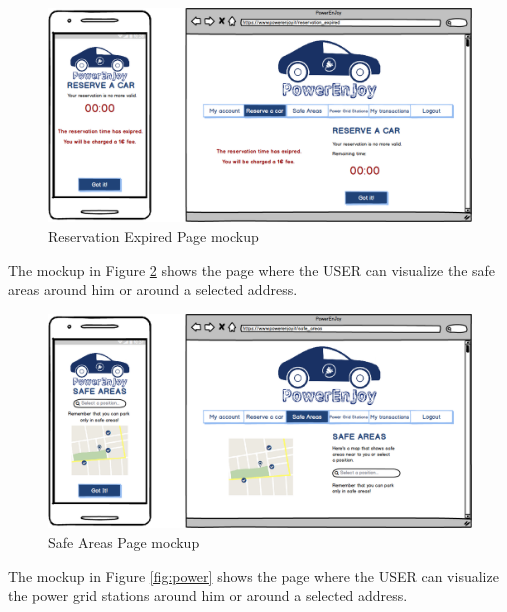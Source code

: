 \vspace{80pt}

\begin{figure}[htbp]
\centering
\includegraphics[width=\textwidth]{Images/Mockups/ReservationExpired}
\caption{Reservation Expired Page mockup}
\label{fig:expired}
\end{figure}
\clearpage

\newline
The mockup in Figure \ref{fig:safe} shows the page where the USER can visualize the safe areas around him or around a selected address.

\vspace{80pt}

\begin{figure}[htbp]
\centering
\includegraphics[width=\textwidth]{Images/Mockups/SafePlaces}
\caption{Safe Areas Page mockup}
\label{fig:safe}
\end{figure}
\clearpage

\newline
The mockup in Figure \ref{fig:power} shows the page where the USER can visualize the power grid stations around him or around a selected address.

